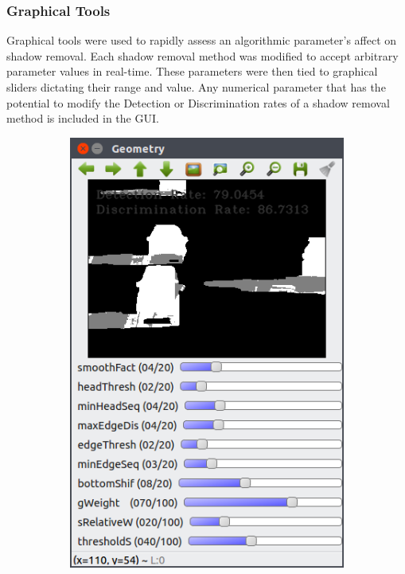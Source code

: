 \documentclass[12pt]{report}
\begin{document}
\subsubsection{Graphical Tools}
Graphical tools were used to rapidly assess an algorithmic parameter's affect on shadow removal. Each shadow removal method was modified to accept arbitrary parameter values in real-time. These parameters were then tied to graphical sliders dictating their range and value. Any numerical parameter that has the potential to modify the Detection or Discrimination rates of a shadow removal method is included in the GUI.

\begin{figure}
\centering
\begin{subfigure}{.49\linewidth}
  \centering
  \includegraphics[width=.7\linewidth]{figures/geo_highway1_default.png}
  \label{fig:sub1}
\end{subfigure}
\hfill
\begin{subfigure}{.49\linewidth}
  \centering

\end{subfigure}
\end{figure}
\end{document}
